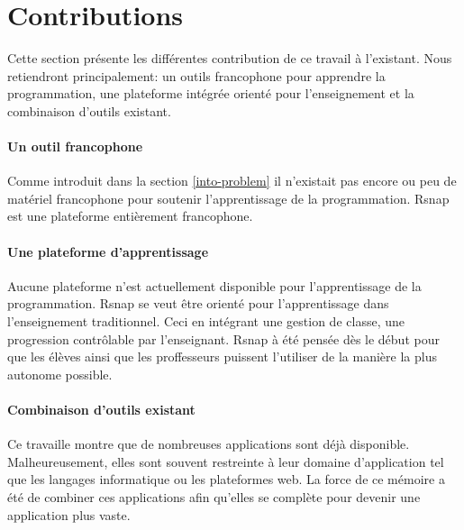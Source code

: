 \section{Contributions}
\label{intro-contribution}
Cette section présente les différentes contribution de ce travail à l'existant. Nous retiendront principalement: un outils francophone pour apprendre la programmation, une plateforme intégrée orienté pour l'enseignement et la combinaison d'outils existant.

\paragraph{Un outil francophone} Comme introduit dans la section \ref{into-problem} il n'existait pas encore ou peu de matériel francophone pour soutenir l'apprentissage de la programmation. Rsnap est une plateforme entièrement francophone.%

\paragraph{Une plateforme d'apprentissage} Aucune plateforme n'est actuellement disponible pour l'apprentissage de la programmation. Rsnap se veut être orienté pour l'apprentissage dans l'enseignement traditionnel. Ceci en intégrant une gestion de classe, une progression contrôlable par l'enseignant. Rsnap à été pensée dès le début pour que les élèves ainsi que les proffesseurs puissent l'utiliser de la manière la plus autonome possible.

\paragraph{Combinaison d'outils existant} Ce travaille montre que de nombreuses applications sont déjà disponible. Malheureusement, elles sont souvent restreinte à leur domaine d'application tel que les langages informatique ou les plateformes web. La force de ce mémoire a été de combiner ces applications afin qu'elles se complète pour devenir une application plus vaste.


%
%
%
%
%
%
%
%
%
